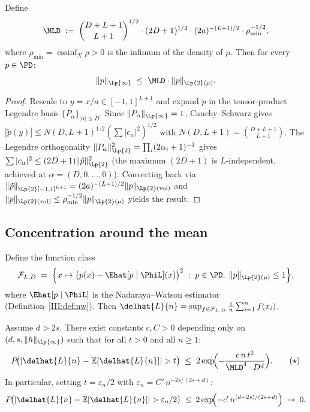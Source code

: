 \begin{lemma}
\label{III:lem:bounded}
Define
\[
  \MLD \;:=\;
  \binom{D+L+1}{L+1}^{1/2}
  \cdot (2D+1)^{1/2}
  \cdot (2a)^{-(L+1)/2}
  \cdot \rho_{\min}^{-1/2},
\]
where $\rho_{\min} = \operatorname{essinf}_X \rho > 0$ is the infimum of
the density of $\mu$.
Then for every $p \in \PD$:
\[
  \|p\|_{\Lp{\infty}} \;\leq\; \MLD \cdot \|p\|_{\Lp{2}(\mu)}.
\]
\end{lemma}

\begin{proof}
Rescale to $y = x/a \in [-1,1]^{L+1}$ and expand $\tilde p$ in the
tensor-product Legendre basis $\{P_\alpha\}_{|\alpha|\leq D}$.
Since $\|P_\alpha\|_{\Lp{\infty}} = 1$, Cauchy--Schwarz gives
$|\tilde p(y)| \leq N(D,L+1)^{1/2}(\sum|c_\alpha|^2)^{1/2}$
with $N(D,L+1) = \binom{D+L+1}{L+1}$.
The Legendre orthogonality $\|P_\alpha\|_{\Lp{2}}^2 = \prod_i(2\alpha_i+1)^{-1}$
gives $\sum|c_\alpha|^2 \leq (2D+1)\|\tilde p\|_{\Lp{2}}^2$ (the
maximum $(2D+1)$ is $L$-independent, achieved at $\alpha=(D,0,\ldots,0)$).
Converting back via
$\|\tilde p\|_{\Lp{2}[-1,1]^{L+1}} = (2a)^{-(L+1)/2}\|p\|_{\Lp{2}(\mathrm{vol})}$
and $\|p\|_{\Lp{2}(\mathrm{vol})} \leq \rho_{\min}^{-1/2}\|p\|_{\Lp{2}(\mu)}$
yields the result.
\end{proof}

\subsection{Concentration around the mean}
\label{III:subsec:mcdiarmiid}

Define the function class
\[
  \mathcal{F}_{L,D}
  \;=\;
  \Bigl\{x \mapsto \bigl(p(x) - \Ehat[p \mid \PhiL](x)\bigr)^2
    \;:\; p \in \PD,\; \|p\|_{\Lp{2}(\mu)} \leq 1\Bigr\},
\]
where $\Ehat[p \mid \PhiL]$ is the Nadaraya--Watson estimator
(Definition~\ref{III:def:nw}).
Then $\delhat{L}{n} = \sup_{f \in \mathcal{F}_{L,D}} \frac{1}{n}\sum_{i=1}^n f(x_i)$.

\begin{proposition}
\label{III:prop:concentration}
Assume $d > 2s$.
There exist constants $c, C > 0$ depending only on $(d, s, \|h\|_{\Lp{\infty}})$
such that for all $t > 0$ and all $n \geq 1$:
\[
  P\!\bigl(|\delhat{L}{n} - \mathbb{E}[\delhat{L}{n}]| > t\bigr)
  \;\leq\;
  2\exp\!\Bigl(-\frac{c\,n\,t^2}{\MLD^4 \cdot D^d}\Bigr).
  \tag{$\star$}
\]
In particular, setting $t = \varepsilon_n/2$ with
$\varepsilon_n = C'\,n^{-2s/(2s+d)}$:
\[
  P\!\bigl(|\delhat{L}{n} - \mathbb{E}[\delhat{L}{n}]| > \varepsilon_n/2\bigr)
  \;\leq\;
  2\exp\!\Bigl(-c'\,n^{(d-2s)/(2s+d)}\Bigr)
  \;\to\; 0.
\]
\end{proposition}

